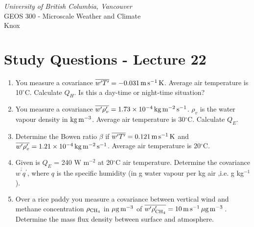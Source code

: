 \documentclass[11pt]{article}
\author{Andy Black and Andreas Christen}
\begin{document}
\begin{center}
\emph{University of British Columbia, Vancouver}\\
GEOS 300 - Microscale Weather and Climate\\
Knox
\section*{Study Questions - Lecture 22}
\end{center}

\begin{enumerate}

\item You measure a covariance $\overline{w^{\prime}T^{\prime}} = -0.031\,\rm{m}\,\rm{s}^{-1}\,\rm{K}$. Average air temperature is 10$^{\circ}$C. Calculate $Q_H$. Is this a day-time or night-time situation?

\item You measure a covariance $\overline{w^{\prime}\rho_v^{\prime}} = 1.73 \times 10^{-4}\, \rm{kg}\,\rm{m}^{-2}\,\rm{s}^{-1}$. $\rho_v$ is the water vapour density in $\rm{kg}\,\rm{m}^{-3}$. Average air temperature is 30$^{\circ}$C. Calculate $Q_E$.

\item Determine the Bowen ratio $\beta$ if $\overline{w^{\prime}T^{\prime}} = 0.121\,\rm{m}\,\rm{s}^{-1}\,\rm{K}$ and $\overline{w^{\prime}\rho_v^{\prime}} = 1.21 \times 10^{-4}\, \rm{kg}\,\rm{m}^{-2}\,\rm{s}^{-1}$. Average air temperature is 20$^{\circ}$C.

\item Given is $Q_E$ = 240 W m$^{-2}$ at 20$^{\circ}$C air temperature. Determine the covariance $\overline{w^{\prime}q^{\prime}}$, where $q$ is the specific humidity (in g water vapour per kg air ,i.e. g kg$^{-1}$).

\item Over a rice paddy you measure a covariance between vertical wind and methane concentration $\rho_{\rm{CH}_4}$ in $\rm{\mu g}\,\rm{m}^{-3}$ of  $\overline{w^{\prime}\rho_{\rm{CH}_4}^{\prime}} = 10 \,\rm{m}\,\rm{s}^{-1}\,\rm{\mu g}\,\rm{m}^{-3}\,$. Determine the mass flux density between surface and atmosphere.

\end{enumerate}

\noindent
\end{document}
